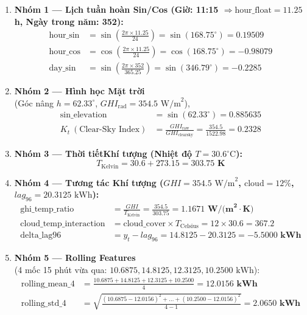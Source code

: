 \documentclass[12pt,a4paper]{article}
\begin{document}
\begin{enumerate}
    \item \textbf{Nhóm 1 --- Lịch tuần hoàn Sin/Cos (Giờ: 11:15 $\Rightarrow \text{hour\_float} = 11.25$h, Ngày trong năm: 352):}
    \begin{align}
        \text{hour\_sin} &= \sin\left(\frac{2\pi \times 11.25}{24}\right) = \sin(168.75^\circ) = \mathbf{0.19509} \\
        \text{hour\_cos} &= \cos\left(\frac{2\pi \times 11.25}{24}\right) = \cos(168.75^\circ) = \mathbf{-0.98079} \\
        \text{day\_sin} &= \sin\left(\frac{2\pi \times 352}{365.25}\right) = \sin(346.79^\circ) = \mathbf{-0.2285}
    \end{align}

\item \textbf{Nhóm 2 --- Hình học Mặt trời}\\(Góc nâng $h = 62.33^\circ$, $GHI_{\text{rad}} = 354.5\text{ W/m}^2$),
    \begin{align}
        \text{sin\_elevation} &= \sin(62.33^\circ) = \mathbf{0.885635} \\
        K_t \ (\text{Clear-Sky Index}) &= \frac{GHI_{\text{raw}}}{GHI_{\text{clearsky}}} = \frac{354.5}{1522.98} = \mathbf{0.2328}
    \end{align}

    \item \textbf{Nhóm 3 --- Thời tiếtKhí tượng (Nhiệt độ $T = 30.6^\circ\text{C}$):}
    \begin{equation}
        T_{\text{Kelvin}} = 30.6 + 273.15 = \mathbf{303.75 \text{ K}}
    \end{equation}

    \item \textbf{Nhóm 4 --- Tương tác Khí tượng ($GHI = 354.5 \text{ W/m}^2$, $\text{cloud} = 12\%$, $lag_{96} = 20.3125 \text{ kWh}$):}
    \begin{align}
        \text{ghi\_temp\_ratio} &= \frac{GHI}{T_{\text{Kelvin}}} = \frac{354.5}{303.75} = \mathbf{1.1671 \text{ W/(m}^2\cdot\text{K)}} \\
        \text{cloud\_temp\_interaction} &= \text{cloud\_cover} \times T_{\text{Celsius}} = 12 \times 30.6 = \mathbf{367.2} \\
        \text{delta\_lag96} &= y_t - lag_{96} = 14.8125 - 20.3125 = \mathbf{-5.5000 \text{ kWh}}
    \end{align}

    \item \textbf{Nhóm 5 --- Rolling Features}\\
(4 mốc 15 phút vừa qua: $10.6875, 14.8125, 12.3125, 10.2500 \text{ kWh}$):
    \begin{align}
        \text{rolling\_mean\_4} &= \frac{10.6875 + 14.8125 + 12.3125 + 10.2500}{4} = \mathbf{12.0156 \text{ kWh}} \\
        \text{rolling\_std\_4} &= \sqrt{\frac{(10.6875-12.0156)^2 + \dots + (10.2500-12.0156)^2}{4 - 1}} = \mathbf{2.0650 \text{ kWh}}
    \end{align}
\end{enumerate}
\end{document}
